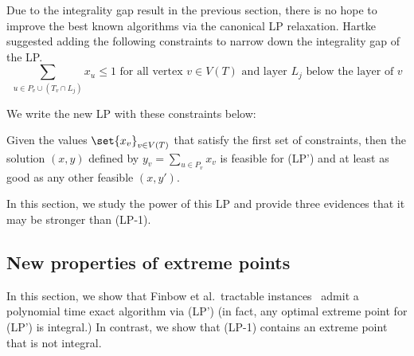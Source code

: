 
\label{sec:newlp}

\newcommand{\vset}{{\mathcal{V}}}
Due to the integrality gap result in the previous section, there is no hope to improve the best known algorithms via the canonical LP relaxation. 
Hartke~\cite{Hartke2006} suggested adding the following constraints to narrow down the integrality gap of the LP. 
\[\sum_{ u\in P_v \cup (T_v \cap L_j)} x_u \leq 1 \mbox{ for all vertex $v \in V(T)$ and layer $L_j$ below the layer of $v$} \] 

We write the new LP with these constraints below: 
\vspace{0.1in}

\noindent
{}

\begin{proposition} 
\label{prop:setyvalues}
Given the values $\set{x_v}_{v \in V(T)}$ that satisfy the first set of constraints, then the solution $(x,y)$ defined by $y_v = \sum_{u \in P_v} x_v$ is feasible for (LP') and at least as good as any other feasible $(x,y')$.  
\end{proposition} 

In this section, we study the power of this LP and provide three evidences that it may be stronger than (LP-1). 

\subsection{New properties of extreme points}
In this section, we show that Finbow et al.~tractable instances~\cite{FinbowG09} admit a polynomial time exact algorithm via (LP') (in fact, any optimal extreme point for (LP') is integral.) 
In contrast, we show that (LP-1) contains an extreme point that is not integral.   



